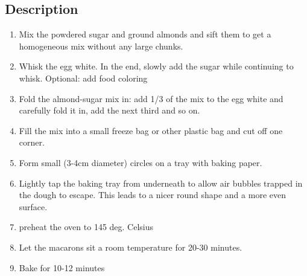 \subsection{Description}
\begin{enumerate}
	\item Mix the powdered sugar and ground almonds and sift them to get a homogeneous mix without any large chunks.
	\item Whisk the egg white. In the end, slowly add the sugar while continuing to whisk. Optional: add food coloring
	\item Fold the almond-sugar mix in: add 1/3 of the mix to the egg white and carefully fold it in, add the next third and so on.
	\item Fill the mix into a small freeze bag or other plastic bag and cut off one corner.
	\item Form small (3-4cm diameter) circles on a tray with baking paper.
	\item Lightly tap the baking tray from underneath to allow air bubbles trapped in the dough to escape. This leads to a nicer round shape and a more even surface.
	\item preheat the oven to 145 deg. Celsius
	\item Let the macarons sit a room temperature for 20-30 minutes.
	\item Bake for 10-12 minutes
\end{enumerate}

